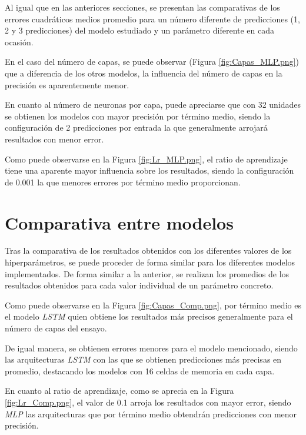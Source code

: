 Al igual que en las anteriores secciones, se presentan las comparativas de los errores 
cuadráticos medios promedio para un número diferente de predicciones (1, 2 y 3 predicciones) del modelo 
estudiado y un parámetro diferente en cada ocasión.

En el caso del número de capas, se puede observar (Figura \ref{fig:Capas_MLP.png}) que a diferencia de
los otros modelos, la influencia del número de capas en la precisión es aparentemente menor.

En cuanto al número de neuronas por capa, puede apreciarse que con 32 unidades se obtienen los modelos
con mayor precisión por término medio, siendo la configuración de 2 predicciones por entrada la que
generalmente arrojará resultados con menor error.

Como puede observarse en la Figura \ref{fig:Lr_MLP.png}, el ratio de aprendizaje tiene una aparente
mayor influencia sobre los resultados, siendo la configuración de 0.001 la que menores errores por
término medio proporcionan.

\section{Comparativa entre modelos}
Tras la comparativa de los resultados obtenidos con los diferentes valores de los hiperparámetros, 
se puede proceder de forma similar para los diferentes modelos implementados.
De forma similar a la anterior, se realizan los promedios de los resultados obtenidos para cada valor 
individual de un parámetro concreto.

Como puede observarse en la Figura \ref{fig:Capas_Comp.png}, por término medio es el modelo \textit{LSTM}
quien obtiene los resultados más precisos generalmente para el número de capas del ensayo.

De igual manera, se obtienen errores menores para el modelo mencionado, siendo las 
arquitecturas \textit{LSTM} con las que se obtienen predicciones más precisas en promedio, destacando los
modelos con 16 celdas de memoria en cada capa.

En cuanto al ratio de aprendizaje, como se aprecia en la Figura \ref{fig:Lr_Comp.png}, el valor de 
0.1 arroja los resultados con mayor error, siendo \textit{MLP} las arquitecturas que por término medio
obtendrán predicciones con menor precisión.

